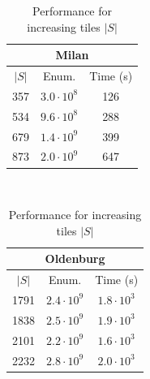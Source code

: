 \documentclass[preprint,12pt,authoryear]{elsarticle} %
\renewcommand{\sf}[1]{\textsf{\textup{#1}}}
\begin{document}
\begin{table}[t]
\scriptsize\centering
\caption{Performance for increasing tiles $|S|$}
\label{tab:efftiles}%

\begin{tabular}{ccc}
\multicolumn{3}{c}{\sf{Milan}}\\
\toprule
$|S|$ &        Enum. & Time (s) \\
\midrule
357 &  $3.0\cdot10^{8}$ &      126 \\
534 &  $9.6\cdot10^{8}$ &      288 \\
679 &  $1.4\cdot10^{9}$ &      399 \\
873 &  $2.0\cdot10^{9}$ &      647 \\
\bottomrule
\end{tabular}
~
\begin{tabular}{ccc}
\multicolumn{3}{c}{\sf{Oldenburg}}\\
\toprule
$|S|$ &          Enum. &          Time (s) \\
\midrule
1791 &  $2.4\cdot10^{9}$ &  $1.8\cdot10^{3}$ \\
1838 &  $2.5\cdot10^{9}$ &  $1.9\cdot10^{3}$ \\
2101 &  $2.2\cdot10^{9}$ &  $1.6\cdot10^{3}$ \\
2232 &  $2.8\cdot10^{9}$ &  $2.0\cdot10^{3}$ \\
\bottomrule
\end{tabular}
\end{table}%
\end{document}
